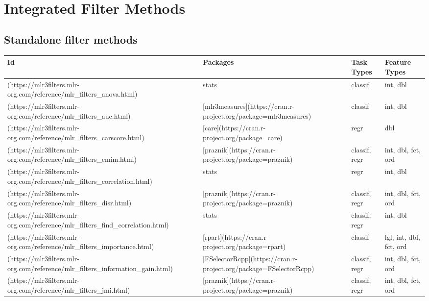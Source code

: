 \documentclass[
]{scrbook}
\begin{document}
\hypertarget{list-filters}{%
\section{Integrated Filter Methods}\label{list-filters}}

\hypertarget{fs-filter-list}{%
\subsection{Standalone filter methods}\label{fs-filter-list}}

\begin{tabular}{l|l|l|l}
\hline
Id & Packages & Task Types & Feature Types\\
\hline
[`anova`](https://mlr3filters.mlr-org.com/reference/mlr\_filters\_anova.html) & stats & classif & int, dbl\\
\hline
[`auc`](https://mlr3filters.mlr-org.com/reference/mlr\_filters\_auc.html) & [mlr3measures](https://cran.r-project.org/package=mlr3measures) & classif & int, dbl\\
\hline
[`carscore`](https://mlr3filters.mlr-org.com/reference/mlr\_filters\_carscore.html) & [care](https://cran.r-project.org/package=care) & regr & dbl\\
\hline
[`cmim`](https://mlr3filters.mlr-org.com/reference/mlr\_filters\_cmim.html) & [praznik](https://cran.r-project.org/package=praznik) & classif, regr & int, dbl, fct, ord\\
\hline
[`correlation`](https://mlr3filters.mlr-org.com/reference/mlr\_filters\_correlation.html) & stats & regr & int, dbl\\
\hline
[`disr`](https://mlr3filters.mlr-org.com/reference/mlr\_filters\_disr.html) & [praznik](https://cran.r-project.org/package=praznik) & classif, regr & int, dbl, fct, ord\\
\hline
[`find\_correlation`](https://mlr3filters.mlr-org.com/reference/mlr\_filters\_find\_correlation.html) & stats & classif, regr & int, dbl\\
\hline
[`importance`](https://mlr3filters.mlr-org.com/reference/mlr\_filters\_importance.html) & [rpart](https://cran.r-project.org/package=rpart) & classif & lgl, int, dbl, fct, ord\\
\hline
[`information\_gain`](https://mlr3filters.mlr-org.com/reference/mlr\_filters\_information\_gain.html) & [FSelectorRcpp](https://cran.r-project.org/package=FSelectorRcpp) & classif, regr & int, dbl, fct, ord\\
\hline
[`jmi`](https://mlr3filters.mlr-org.com/reference/mlr\_filters\_jmi.html) & [praznik](https://cran.r-project.org/package=praznik) & classif, regr & int, dbl, fct, ord\\

\end{tabular}
\end{document}
